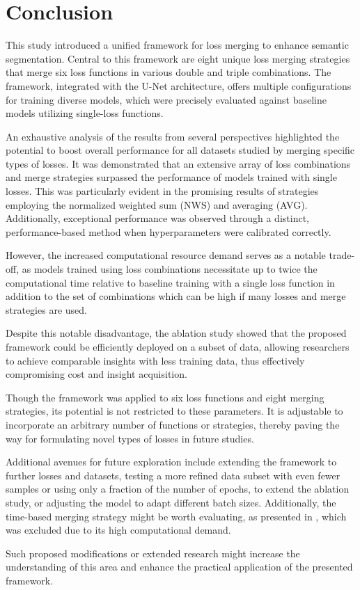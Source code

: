 \chapter{Conclusion}
\label{chap:conclusion}
This study introduced a unified framework for loss merging to enhance semantic segmentation. Central to this framework are eight unique loss merging strategies that merge six loss functions in various double and triple combinations. The framework, integrated with the U-Net architecture, offers multiple configurations for training diverse models, which were precisely evaluated against baseline models utilizing single-loss functions.

An exhaustive analysis of the results from several perspectives highlighted the potential to boost overall performance for all datasets studied by merging specific types of losses. It was demonstrated that an extensive array of loss combinations and merge strategies surpassed the performance of models trained with single losses. This was particularly evident in the promising results of strategies employing the normalized weighted sum (NWS) and averaging (AVG). Additionally, exceptional performance was observed through a distinct, performance-based method when hyperparameters were calibrated correctly.

However, the increased computational resource demand serves as a notable trade-off, as models trained using loss combinations necessitate up to twice the computational time relative to baseline training with a single loss function in addition to the set of combinations which can be high if many losses and merge strategies are used.

Despite this notable disadvantage, the ablation study showed that the proposed framework could be efficiently deployed on a subset of data, allowing researchers to achieve comparable insights with less training data, thus effectively compromising cost and insight acquisition.

Though the framework was applied to six loss functions and eight merging strategies, its potential is not restricted to these parameters. It is adjustable to incorporate an arbitrary number of functions or strategies, thereby paving the way for formulating novel types of losses in future studies.

Additional avenues for future exploration include extending the framework to further losses and datasets, testing a more refined data subset with even fewer samples or using only a fraction of the number of epochs, to extend the ablation study, or adjusting the model to adapt different batch sizes. Additionally, the time-based merging strategy might be worth evaluating, as presented in , which was excluded due to its high computational demand.

Such proposed modifications or extended research might increase the understanding of this area and enhance the practical application of the presented framework.